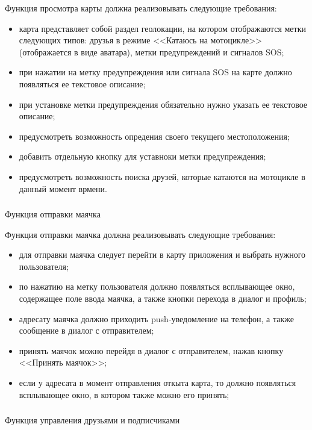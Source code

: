 Функция просмотра карты должна реализовывать следующие требования:
\begin{itemize}
	\item карта представляет собой раздел геолокации, на котором отображаются метки следующих типов: друзья в режиме <<Катаюсь на мотоцикле>> (отображается в виде аватара), метки предупреждений и сигналов SOS;
	\item при нажатии на метку предупреждения или сигнала SOS на карте должно появляться ее текстовое описание;
	\item при установке метки предупреждения обязательно нужно указать ее текстовое описание;
	\item предусмотреть возможность опредения своего текущего местоположения;
	\item добавить отдельную кнопку для уставноки метки предупреждения;
	\item предусмотреть возможность поиска друзей, которые катаются на мотоцикле в данный момент врмени.
\end{itemize}

\subsubsection{} Функция отправки маячка
\label{sec:domain:specification:student_history}

Функция отправки маячка должна реализовывать следующие требования:
\begin{itemize}
	\item для отправки маячка следует перейти в карту приложения и выбрать нужного пользователя;
	\item по нажатию на метку пользователя должно появляться всплывающее окно, содержащее поле ввода маячка, а также кнопки перехода в диалог и профиль;
	\item адресату маячка должно приходить push-уведомление на телефон, а также сообщение в диалог с отправителем;
	\item принять маячок можно перейдя в диалог с отправителем, нажав кнопку <<Принять маячок>>;
	\item если у адресата в момент отправления откыта карта, то должно появляться всплывающее окно, в котором также можно его принять;
\end{itemize}

\subsubsection{} Функция управления друзьями и подписчиками
\label{sec:domain:specification:student_history}

